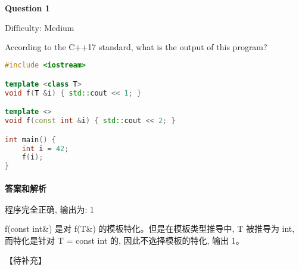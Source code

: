 \documentclass{article}
\begin{document}
	\paragraph*{Question 1} $\boxed{\text{Difficulty: Medium}} $			
	
	According to the C++17 standard, what is the output of this program?
	
	\begin{lstlisting}[language=C++]  		
#include <iostream>

template <class T> 
void f(T &i) { std::cout << 1; }

template <> 
void f(const int &i) { std::cout << 2; }

int main() {
	int i = 42;
	f(i);
}
	\end{lstlisting}
	
	
	\paragraph*{答案和解析} $\boxed{\text{程序完全正确, 输出为: 1}} $
	
	f(const int\&) 是对 f(T\&) 的模板特化。但是在模板类型推导中, T 被推导为 int, 而特化是针对 T = const int 的, 因此不选择模板的特化, 输出 1。
	
	【待补充】
	
\end{document}
